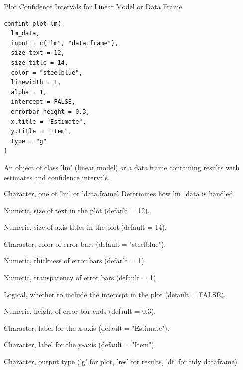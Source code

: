 \documentclass[a4paper]{book}
\begin{document}
%
\begin{Description}
Plot Confidence Intervals for Linear Model or Data Frame
\end{Description}
%
\begin{Usage}
\begin{verbatim}
confint_plot_lm(
  lm_data,
  input = c("lm", "data.frame"),
  size_text = 12,
  size_title = 14,
  color = "steelblue",
  linewidth = 1,
  alpha = 1,
  intercept = FALSE,
  errorbar_height = 0.3,
  x.title = "Estimate",
  y.title = "Item",
  type = "g"
)
\end{verbatim}
\end{Usage}
%
\begin{Arguments}
\begin{ldescription}
\item[\code{lm\_data}] An object of class 'lm' (linear model) or a data.frame containing results with estimates and confidence intervals.

\item[\code{input}] Character, one of 'lm' or 'data.frame'. Determines how lm\_data is handled.

\item[\code{size\_text}] Numeric, size of text in the plot (default = 12).

\item[\code{size\_title}] Numeric, size of axis titles in the plot (default = 14).

\item[\code{color}] Character, color of error bars (default = "steelblue").

\item[\code{linewidth}] Numeric, thickness of error bars (default = 1).

\item[\code{alpha}] Numeric, transparency of error bars (default = 1).

\item[\code{intercept}] Logical, whether to include the intercept in the plot (default = FALSE).

\item[\code{errorbar\_height}] Numeric, height of error bar ends (default = 0.3).

\item[\code{x.title}] Character, label for the x-axis (default = "Estimate").

\item[\code{y.title}] Character, label for the y-axis (default = "Item").

\item[\code{type}] Character, output type ('g' for plot, 'res' for results, 'df' for tidy dataframe).
\end{ldescription}
\end{Arguments}
\end{document}
